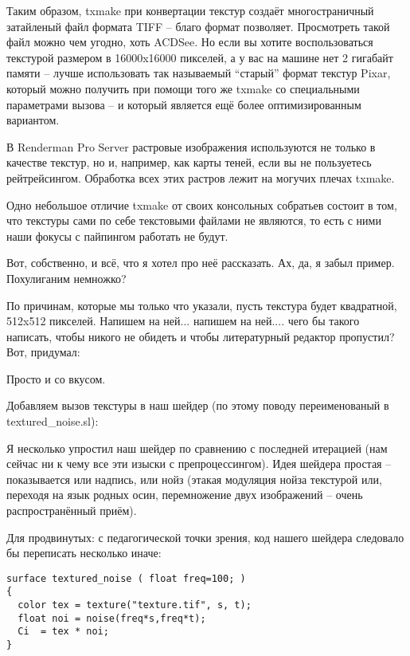   

Таким
    образом, txmake при
    конвертации текстур создаёт многостраничный затайленый файл
    формата TIFF – благо
    формат позволяет. Просмотреть такой файл можно чем угодно,
    хоть ACDSee. Но если вы
    хотите воспользоваться текстурой размером в
    16000x16000 пикселей, а
    у вас на машине нет 2 гигабайт памяти – лучше использовать так
    называемый “старый” формат текстур Pixar, который
    можно получить при помощи того же txmake со
    специальными параметрами вызова – и который является ещё более
    оптимизированным вариантом.
  

 В Renderman Pro Server растровые изображения
    используются не только в качестве текстур, но и, например, как
    карты теней, если вы не пользуетесь рейтрейсингом. Обработка всех
    этих растров лежит на могучих плечах txmake.
  

 Одно небольшое отличие txmake от своих консольных
    собратьев состоит в том, что текстуры сами по себе текстовыми
    файлами не являются, то есть с ними наши фокусы с пайпингом
    работать не будут.
  

 Вот, собственно, и всё, что я хотел про неё
    рассказать. Ах, да, я забыл пример. Похулиганим
    немножко?
  

 По причинам, которые мы только что указали, пусть
    текстура будет квадратной, 512x512 пикселей. Напишем на ней...
    напишем на ней.... чего бы такого написать, чтобы никого не обидеть
    и чтобы литературный редактор пропустил? Вот, придумал:
  

  

 Просто и со вкусом.
  

 Добавляем вызов текстуры в наш шейдер (по этому поводу переименованый в textured\_noise.sl):



 Я несколько упростил наш шейдер по сравнению с
    последней итерацией (нам сейчас ни к чему все эти изыски с
    препроцессингом). Идея шейдера простая – показывается или надпись,
    или нойз (этакая модуляция нойза текстурой или, переходя на язык
    родных осин, перемножение двух изображений – очень распространённый
    приём).
  

 Для
    продвинутых: с педагогической точки
    зрения, код нашего шейдера следовало бы переписать несколько
    иначе:
  
\begin{lstlisting}[frame=single, framerule=0pt, framesep=10pt, xleftmargin=10pt, xrightmargin=10pt, basicstyle=\ttfamily \small, backgroundcolor=\color{light-gray}]
surface textured_noise ( float freq=100; )
{
  color tex = texture("texture.tif", s, t);
  float noi = noise(freq*s,freq*t);
  Ci  = tex * noi;
}
\end{lstlisting}
  

